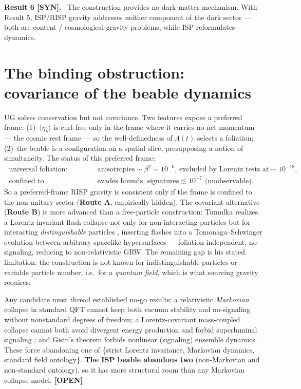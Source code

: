 \documentclass[aps,prd,preprint,amsmath,amssymb,nofootinbib,superscriptaddress]{revtex4-2}
\newenvironment{result}[1]{\par\medskip\noindent\textbf{#1}\ }{\par\medskip}
\begin{document}
\begin{result}{Result 6 [SYN].}
The construction provides no dark-matter mechanism. With Result 5, ISP/RISP gravity
addresses neither component of the dark sector --- both are content / cosmological-gravity
problems, while ISP reformulates dynamics.
\end{result}

\section{The binding obstruction: covariance of the beable dynamics}

UG solves conservation but not covariance. Two features expose a preferred frame:
(1)~$\langle\eta_\nu\rangle$ is curl-free only in the frame where it carries no net momentum
--- the cosmic rest frame --- so the well-definedness of $\Lambda(t)$ selects a foliation;
(2)~the beable is a configuration on a spatial slice, presupposing a notion of simultaneity.
The status of this preferred frame:
{\footnotesize
\begin{equation}
\boxed{\;
\begin{array}{ll}
\text{universal foliation:} & \text{anisotropies}\sim\beta^2\sim10^{-6}\text{, excluded by Lorentz tests at}\sim10^{-18},\\
\text{confined to gravity/decoherence:} & \text{evades bounds, signatures}\lesssim10^{-7}\text{ (unobservable)}.
\end{array}\;}
\end{equation}}
So a preferred-frame RISP gravity is consistent only if the frame is confined to the
non-unitary sector (\textbf{Route A}, empirically hidden). The covariant alternative
(\textbf{Route B}) is more advanced than a free-particle construction: Tumulka realizes a
Lorentz-invariant flash collapse not only for non-interacting particles \cite{Tumulka2006}
but for interacting \emph{distinguishable} particles \cite{Tumulka2020}, inserting flashes
into a Tomonaga--Schwinger evolution between arbitrary spacelike hypersurfaces ---
foliation-independent, no-signaling, reducing to non-relativistic GRW. The remaining gap is
his stated limitation: the construction is not known for indistinguishable particles or
variable particle number, i.e.\ for a \emph{quantum field}, which is what sourcing gravity
requires.

Any candidate must thread established no-go results: a relativistic \emph{Markovian} collapse
in standard QFT cannot keep both vacuum stability and no-signaling without nonstandard
degrees of freedom; a Lorentz-covariant mass-coupled collapse cannot both avoid divergent
energy production and forbid superluminal signaling \cite{MassCoupled2020}; and Gisin's
theorem \cite{Gisin1989} forbids nonlinear (signaling) ensemble dynamics. These force
abandoning one of \{strict Lorentz invariance, Markovian dynamics, standard field ontology\}.
\textbf{The ISP beable abandons two} (non-Markovian and non-standard ontology), so it has
more structural room than any Markovian collapse model. \textbf{[OPEN]}
\end{document}
